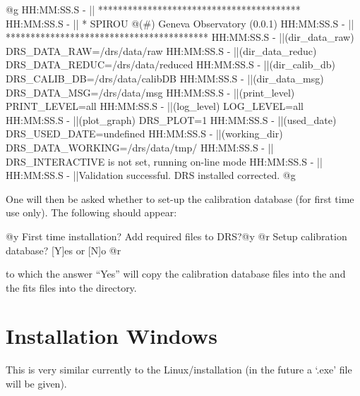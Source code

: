 \begin{cmdboxprintspecial}
@g
HH:MM:SS.S -   || *****************************************
HH:MM:SS.S -   || * SPIROU @(#) Geneva Observatory (0.0.1)
HH:MM:SS.S -   || *****************************************
HH:MM:SS.S -   ||(dir_data_raw)      DRS_DATA_RAW=/drs/data/raw
HH:MM:SS.S -   ||(dir_data_reduc)    DRS_DATA_REDUC=/drs/data/reduced
HH:MM:SS.S -   ||(dir_calib_db)      DRS_CALIB_DB=/drs/data/calibDB
HH:MM:SS.S -   ||(dir_data_msg)      DRS_DATA_MSG=/drs/data/msg
HH:MM:SS.S -   ||(print_level)       PRINT_LEVEL=all         %
HH:MM:SS.S -   ||(log_level)         LOG_LEVEL=all         %
HH:MM:SS.S -   ||(plot_graph)        DRS_PLOT=1            %
HH:MM:SS.S -   ||(used_date)         DRS_USED_DATE=undefined
HH:MM:SS.S -   ||(working_dir)       DRS_DATA_WORKING=/drs/data/tmp/
HH:MM:SS.S -   ||                    DRS_INTERACTIVE is not set, running on-line mode
HH:MM:SS.S -   ||
HH:MM:SS.S -   ||Validation successful. DRS installed corrected.
@g
\end{cmdboxprintspecial}

\noindent One will then be asked whether to set-up the calibration database (for first time use only). The following should appear:

\begin{cmdboxprintspecial}
@y		First time installation?
		Add required files to DRS?@y
@r			Setup calibration database? [Y]es or [N]o @r
\end{cmdboxprintspecial}

\noindent to which the answer ``Yes'' will copy the calibration database files into the \masterCALIBDBfile and the fits files into the  directory.












\clearpage
\newpage
\section{Installation Windows}
\label{ch:install:install_win}

This is very similar currently to the Linux/\mac installation (in the future a `.exe' file will be given).

